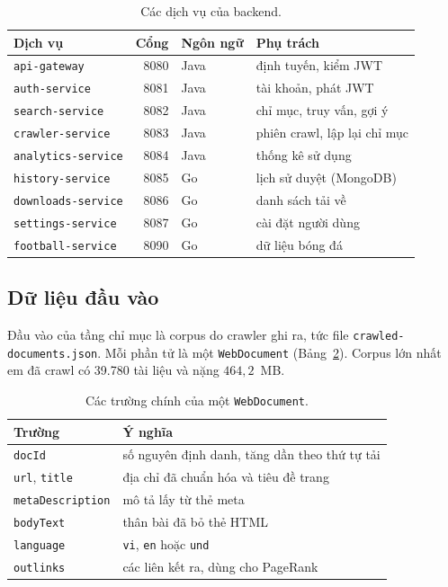 \documentclass[9pt,twocolumn,a4paper]{extarticle}
\newcommand{\code}[1]{\texttt{#1}}
\begin{document}
\begin{table}[H]
\centering
\caption{Các dịch vụ của backend.}
\label{tab:services}
\footnotesize
\begin{tabular}{@{}p{2.3cm}rlp{3.0cm}@{}}
\toprule
Dịch vụ & Cổng & Ngôn ngữ & Phụ trách \\
\midrule
\code{api-gateway} & 8080 & Java & định tuyến, kiểm JWT \\
\code{auth-service} & 8081 & Java & tài khoản, phát JWT \\
\code{search-service} & 8082 & Java & chỉ mục, truy vấn, gợi ý \\
\code{crawler-service} & 8083 & Java & phiên crawl, lập lại chỉ mục \\
\code{analytics-service} & 8084 & Java & thống kê sử dụng \\
\code{history-service} & 8085 & Go & lịch sử duyệt (MongoDB) \\
\code{downloads-service} & 8086 & Go & danh sách tải về \\
\code{settings-service} & 8087 & Go & cài đặt người dùng \\
\code{football-service} & 8090 & Go & dữ liệu bóng đá \\
\bottomrule
\end{tabular}
\end{table}

\subsection{Dữ liệu đầu vào}
\label{sec:input}
Đầu vào của tầng chỉ mục là corpus do crawler ghi ra, tức file \code{crawled-documents.json}. Mỗi phần tử là một \code{WebDocument} (Bảng~\ref{tab:doc}). Corpus lớn nhất em đã crawl có 39.780 tài liệu và nặng $464{,}2$~MB.

\begin{table}[H]
\centering
\caption{Các trường chính của một \code{WebDocument}.}
\label{tab:doc}
\footnotesize
\begin{tabular}{@{}p{2.3cm}p{5.3cm}@{}}
\toprule
Trường & Ý nghĩa \\
\midrule
\code{docId} & số nguyên định danh, tăng dần theo thứ tự tải \\
\code{url}, \code{title} & địa chỉ đã chuẩn hóa và tiêu đề trang \\
\code{metaDescription} & mô tả lấy từ thẻ meta \\
\code{bodyText} & thân bài đã bỏ thẻ HTML \\
\code{language} & \code{vi}, \code{en} hoặc \code{und} \\
\code{outlinks} & các liên kết ra, dùng cho PageRank \\
\bottomrule
\end{tabular}
\end{table}
\end{document}
